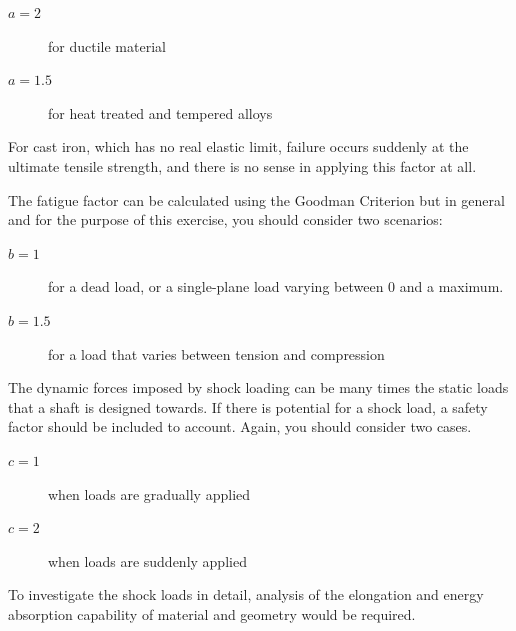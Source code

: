 \begin{description}
    \item[\(a=2\)] for ductile material
    \item[\(a=1.5\)] for heat treated and tempered alloys
\end{description}

For cast iron, which has no real elastic limit, failure occurs suddenly at the ultimate tensile strength, and there is no sense in applying this factor at all.

The fatigue factor can be calculated using the Goodman Criterion but in general and for the purpose of this exercise, you should consider two scenarios:




\begin{description}
    \item[\(b=1\)] for a dead load, or a single-plane load varying between 0 and a maximum.
    \item[\(b=1.5\)] for a load that varies between tension and compression
\end{description}

The dynamic forces imposed by shock loading can be many times the static loads that a shaft is designed towards. If there is potential for a shock load, a safety factor should be included to account. Again, you should consider two cases.

\begin{description}
    \item[\(c=1\)] when loads are gradually applied
    \item[\(c=2\)] when loads are suddenly applied
\end{description}

To investigate the shock loads in detail, analysis of the elongation and energy absorption capability of material and geometry would be required.

